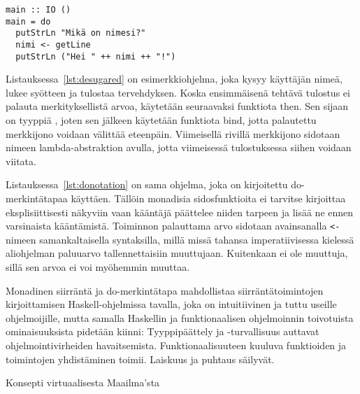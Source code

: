 \documentclass[finnish]{tktltiki2}
\begin{document}
\begin{lstlisting}[float,label={lst:donotation},caption={Imperatiivinen tyyli ja do-merkintätapa}]
main :: IO ()
main = do
  putStrLn "Mikä on nimesi?"
  nimi <- getLine
  putStrLn ("Hei " ++ nimi ++ "!")
\end{lstlisting}

Listauksessa~\ref{lst:desugared} on esimerkkiohjelma, joka kysyy käyttäjän nimeä, lukee syötteen ja
tulostaa tervehdyksen. Koska ensimmäisenä tehtävä tulostus ei palauta merkityksellistä arvoa,
käytetään seuraavaksi funktiota then. Sen sijaan  on tyyppiä , joten
sen jälkeen käytetään funktiota bind, jotta palautettu merkkijono voidaan välittää eteenpäin.
Viimeisellä rivillä merkkijono sidotaan nimeen  lambda-abstraktion avulla, jotta
viimeisessä tulostuksessa siihen voidaan viitata.

Listauksessa~\ref{lst:donotation} on sama ohjelma, joka on kirjoitettu do-merkintätapaa käyttäen.
Tällöin monadisia sidosfunktioita ei tarvitse kirjoittaa eksplisiittisesti näkyviin vaan kääntäjä
päättelee niiden tarpeen ja lisää ne ennen varsinaista kääntämistä. Toiminnon 
palauttama arvo sidotaan avainsanalla \verb|<-| nimeen samankaltaisella syntaksilla, millä missä
tahansa imperatiivisessa kielessä aliohjelman paluuarvo tallennettaisiin muuttujaan. Kuitenkaan
 ei ole muuttuja, sillä sen arvoa ei voi myöhemmin muuttaa.

Monadinen siirräntä ja do-merkintätapa mahdollistaa siirräntätoimintojen kirjoittamisen
Haskell-ohjelmissa tavalla, joka on intuitiivinen ja tuttu useille ohjelmoijille, mutta samalla
Haskellin ja funktionaalisen ohjelmoinnin toivotuista ominaisuuksista pidetään kiinni:
Tyyppipäättely ja -turvallisuus auttavat ohjelmointivirheiden havaitsemista. Funktionaalisuuteen
kuuluva funktioiden ja toimintojen yhdistäminen toimii. Laiskuus ja puhtaus säilyvät.




Konsepti virtuaalisesta Maailma'sta

%
%
\end{document}
